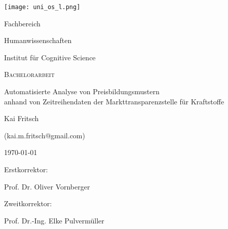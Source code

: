 
\begin{center}
	\texttt{[image: uni\_os\_l.png]}\\

	\vspace{0.5cm}
	{\Large Fachbereich \par}
	{\Large Humanwissenschaften \par}
	{\Large Institut für Cognitive Science \par}
	\vspace{2cm}
	{\scshape\LARGE Bachelorarbeit\par}
	\vspace{0.5cm}
	{\Large Automatisierte Analyse von Preisbildungsmustern\\
	anhand von Zeitreihendaten der Markttransparenzstelle für Kraftstoffe \par}
	\vspace{2cm}
	{\LARGE Kai Fritsch \par}
	{(kai.m.fritsch@gmail.com) \par}
	\vfill
	{\LARGE \today\par}
	\vspace{2cm}
	\begin{multicols}{2}
	Erstkorrektor: \par
	{\Large Prof. Dr. Oliver Vornberger\par}
	\columnbreak
	Zweitkorrektor: \par
	{\Large Prof. Dr.-Ing. Elke Pulvermüller}
	\end{multicols}


	
\end{center}
